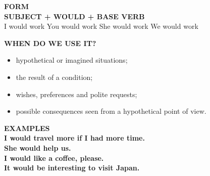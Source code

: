 \documentclass[a4paper,11pt]{article}
\begin{document}
\vspace{2.5mm}\hspace*{6mm}
\begin{minipage}{0.91\textwidth}

\begin{violetbox}
\textbf{\color{VioletDark}FORM}\\[1mm]
\centering
{\Large \textbf{SUBJECT + WOULD + BASE VERB}}\\[1mm]
\small
I would work \quad You would work \quad She would work \quad We would work
\end{violetbox}

\vspace{2.5mm}
\begin{center}
\end{center}

\vspace{1.5mm}
\begin{violetbox}
\textbf{\color{VioletDark}WHEN DO WE USE IT?}\\[1mm]
\begin{itemize}\setlength{\itemsep}{0.4mm}
\item hypothetical or imagined situations;
\item the result of a condition;
\item wishes, preferences and polite requests;
\item possible consequences seen from a hypothetical point of view.
\end{itemize}
\end{violetbox}

\vspace{2mm}
\begin{violetbox}
\textbf{\color{VioletDark}EXAMPLES}\\[1mm]
\textbf{I would travel more if I had more time.}\\
\textbf{She would help us.}\\
\textbf{I would like a coffee, please.}\\
\textbf{It would be interesting to visit Japan.}
\end{violetbox}


\end{minipage}
\end{document}
